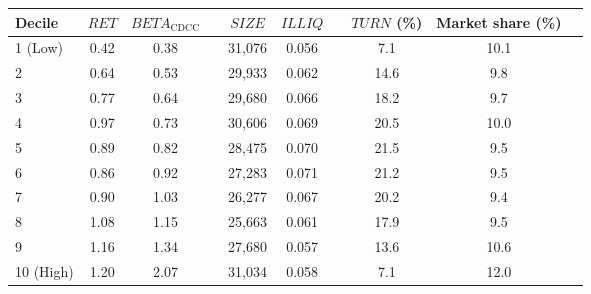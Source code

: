 \begin{tabular}{@{}lccccccccc@{}}
	\toprule
	Decile & $\textit{RET}$ & $\textit{BETA}_\textrm{CDCC}$ && $\textit{SIZE}$ & $\textit{ILLIQ}$ && $\textit{TURN}$ (\%) & Market share (\%) \\ \midrule
1 (Low) & 0.42 & 0.38 && 31,076 & 0.056 && 7.1 & 10.1 \\
2       & 0.64 & 0.53 && 29,933 & 0.062 && 14.6 & 9.8 \\
3       & 0.77 & 0.64 && 29,680 & 0.066 && 18.2 & 9.7 \\
4       & 0.97 & 0.73 && 30,606 & 0.069 && 20.5 & 10.0 \\
5       & 0.89 & 0.82 && 28,475 & 0.070 && 21.5 & 9.5 \\
6       & 0.86 & 0.92 && 27,283 & 0.071 && 21.2 & 9.5 \\
7       & 0.90 & 1.03 && 26,277 & 0.067 && 20.2 & 9.4 \\
8       & 1.08 & 1.15 && 25,663 & 0.061 && 17.9 & 9.5 \\
9       & 1.16 & 1.34 && 27,680 & 0.057 && 13.6 & 10.6 \\
10 (High) & 1.20 & 2.07 && 31,034 & 0.058 && 7.1 & 12.0 \\
	\bottomrule
\end{tabular}
